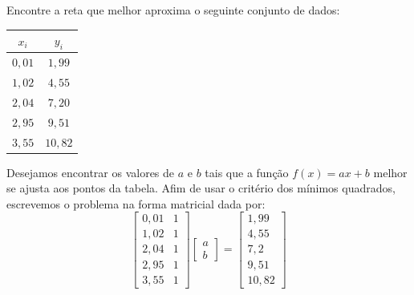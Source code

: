 \begin{ex} Encontre a reta que melhor aproxima o seguinte conjunto de dados:
  \begin{center}
    \begin{tabular}{|c|c|}
      \hline
      $x_i$ & $y_i$\\
      \hline
      $0,01$ & $1,99$\\
      $1,02$ & $4,55$\\
      $2,04$ & $7,20$\\
      $2,95$ & $9,51$\\
      $3,55$ & $10,82$\\
      \hline
    \end{tabular}
  \end{center}
\end{ex}
\begin{sol}
Desejamos encontrar os valores de $a$ e $b$ tais que a função $f(x)=ax+b$ melhor se ajusta aos pontos da tabela. Afim de usar  o critério dos mínimos quadrados, escrevemos o problema na forma matricial dada por:
$$
\left[\begin{array}{cc}
0,01 &1\\
1,02 &1\\
2,04 &1\\
2,95 &1\\
3,55 &1
\end{array}
\right]
\left[\begin{array}{c}
a\\
b
\end{array}
\right]
=
\left[\begin{array}{c}
1,99\\
4,55\\
7,2\\
9,51\\
10,82
\end{array}
\right]
$$


\end{sol}
